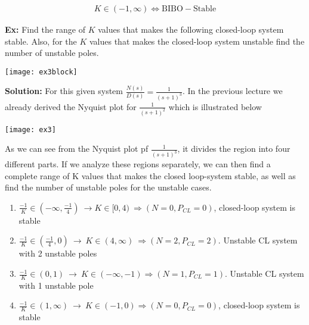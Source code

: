 \documentclass[twoside]{article}
\begin{document}
\begin{align*}
  K \in (-1 , \infty) \Leftrightarrow \mathrm{BIBO-Stable}
\end{align*}

\newpage

\textbf{Ex:} Find the range of $K$ values that makes the
following closed-loop system stable. Also, for the $K$ values that 
makes the closed-loop system unstable find the number of unstable poles.

\vspace{6 pt}

  \begin{minipage}[h]{1\linewidth}
    \begin{center}
      \texttt{[image: ex3block]}
    \end{center}
  \end{minipage}

\vspace{6 pt}

\textbf{Solution:} For this given system $\frac{N(s)}{D(s)} =
\frac{1}{(s+1)^3}$. In the previous lecture we already derived the
Nyquist plot for $\frac{1}{(s+1)^2}$ which is illustrated below

\vspace{6 pt}

  \begin{minipage}[h]{1\linewidth}
    \begin{center}
      \texttt{[image: ex3]}
    \end{center}
  \end{minipage}

\vspace{6 pt}

As we can see from the Nyquist plot pf $\frac{1}{(s+1)^3}$, 
it divides the region into four different parts. If we analyze 
these regions separately, we can then find a complete range of
K values that makes the closed loop-system stable, as well as find the
number of unstable poles for the unstable cases. 
%
\begin{enumerate}
  \item $\frac{-1}{K} \in \left( -\infty , \frac{-1}{4} \right) \
    \rightarrow K \in [0 , 4) \ \Rightarrow ( N = 0 , P_{CL} = 0)$, closed-loop system is stable
%
  \item $ \frac{-1}{K} \in \left( \frac{-1}{4} , 0 \right) \
    \rightarrow \ K \in (4, \infty ) \
    \Rightarrow (N = 2 , P_{CL} = 2)$. Unstable CL system
    with 2 unstable poles
%
    \item $ \frac{-1}{K} \in (0 , 1) \ \rightarrow \ K \in (-\infty , -1)    
\Rightarrow (N = 1 , P_{CL} = 1)$. Unstable CL system
    with 1 unstable pole
%
  \item $\frac{-1}{K} \in (1 , \infty) \ \rightarrow \ K \in (-1,0) 
    \Rightarrow ( N = 0 , P_{CL} = 0)$, closed-loop system is stable
\end{enumerate}
\end{document}
